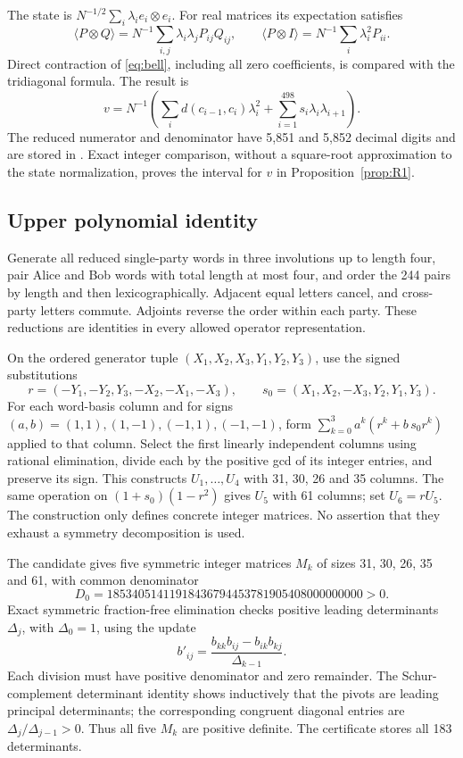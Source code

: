 The state is \(N^{-1/2}\sum_i\lambda_ie_i\otimes e_i\).
For real matrices its expectation satisfies
\[
 \langle P\otimes Q\rangle
   =N^{-1}\sum_{i,j}\lambda_i\lambda_jP_{ij}Q_{ij},\qquad
 \langle P\otimes I\rangle=N^{-1}\sum_i\lambda_i^2P_{ii}.
\]
Direct contraction of \eqref{eq:bell}, including all zero coefficients,
is compared with the tridiagonal formula. The result is
\[
 v=N^{-1}\left(\sum_i d(c_{i-1},c_i)\lambda_i^2+
                       \sum_{i=1}^{498}s_i\lambda_i\lambda_{i+1}\right).
\]
The reduced numerator and denominator have 5,851 and 5,852 decimal
digits and are stored in .
Exact integer comparison, without a square-root approximation to
the state normalization, proves the interval for \(v\) in
Proposition~\ref{prop:R1}.

\subsection{Upper polynomial identity}
Generate all reduced single-party words in three involutions up to
length four, pair Alice and Bob words with total length at most four,
and order the 244 pairs by length and then lexicographically.
Adjacent equal letters cancel, and cross-party letters commute.
Adjoints reverse the order within each party. These reductions are
identities in every allowed operator representation.

On the ordered generator tuple \((X_1,X_2,X_3,Y_1,Y_2,Y_3)\), use
the signed substitutions
\[
 r=(-Y_1,-Y_2,Y_3,-X_2,-X_1,-X_3),\qquad
 s_0=(X_1,X_2,-X_3,Y_2,Y_1,Y_3).
\]
For each word-basis column and for signs
\((a,b)=(1,1),(1,-1),(-1,1),(-1,-1)\), form
\(\sum_{k=0}^3a^k(r^k+b\,s_0r^k)\) applied to that column.
Select the first linearly independent columns using rational
elimination, divide each by the positive gcd of its integer entries,
and preserve its sign. This constructs \(U_1,\ldots,U_4\) with
31, 30, 26 and 35 columns. The same operation on
\((1+s_0)(1-r^2)\) gives \(U_5\) with 61 columns; set \(U_6=rU_5\).
The construction only defines concrete integer matrices. No assertion
that they exhaust a symmetry decomposition is used.

The candidate gives five symmetric integer matrices \(M_k\) of sizes
31, 30, 26, 35 and 61, with common denominator
\[
 D_0=18534051411918436794453781905408000000000>0 .
\]
Exact symmetric fraction-free elimination checks positive leading
determinants \(\Delta_j\), with \(\Delta_0=1\), using the update
\[
 b'_{ij}=\frac{b_{kk}b_{ij}-b_{ik}b_{kj}}{\Delta_{k-1}}.
\]
Each division must have positive denominator and zero remainder.
The Schur-complement determinant identity shows inductively that
the pivots are leading principal determinants; the corresponding
congruent diagonal entries are \(\Delta_j/\Delta_{j-1}>0\).
Thus all five \(M_k\) are positive definite. The certificate stores
all 183 determinants.

